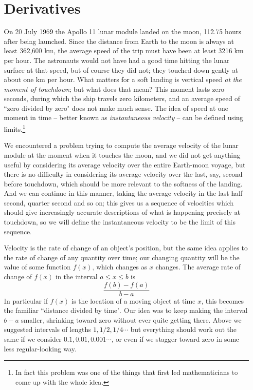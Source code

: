 \section{Derivatives}
On 20 July 1969 the Apollo 11 lunar module landed on the moon, 112.75 hours after being launched. Since the distance from Earth to the moon is always at least 362,600 km, the average speed of the trip must have been at least 3216 km per hour. The astronauts would not have had a good time hitting the lunar surface at that speed, but of course they did not; they touched down gently at about one km per hour. What matters for a soft landing is vertical speed \emph{at the moment of touchdown}; but what does that mean? This moment lasts zero seconds, during which the ship travels zero kilometers, and an average speed of ``zero divided by zero" does not make much sense. The idea of speed at one moment in time -- better known as \emph{instantaneous velocity} -- can be defined using limits.\footnote{In fact this problem was one of the things that first led mathematicians to come up with the whole idea.}

We encountered a problem trying to compute the average velocity of the lunar module at the moment when it touches the moon, and we did not get anything useful by considering its average velocity over the entire Earth-moon voyage, but there is no difficulty in considering its average velocity over the last, say, second before touchdown, which should be more relevant to the softness of the landing. And we can continue in this manner, taking the average velocity in the last half second, quarter second and so on; this gives us a sequence of velocities which  should give increasingly accurate descriptions of what is happening precisely at touchdown, so we will define the instantaneous velocity to be the limit of this sequence.

Velocity is the rate of change of an object's position, but the same idea applies to the rate of change of any quantity over time; our changing quantity will be the value of some function $f(x)$, which changes as $x$ changes. The average rate of change of $f(x)$ in the interval $a \leq x \leq b$ is
\[
\frac{f(b)-f(a)}{b-a}
\]
In particular if $f(x)$ is the location of a moving object at time $x$, this becomes the familiar ``distance divided by time". Our idea was to keep making the interval $b-a$ smaller, shrinking toward zero without ever quite getting there. Above we suggested intervals of lengths $1, 1/2, 1/4 \cdots$ but everything should work out the same if we consider $0.1, 0.01, 0.001 \cdots$, or even if we stagger toward zero in some less regular-looking way. 

